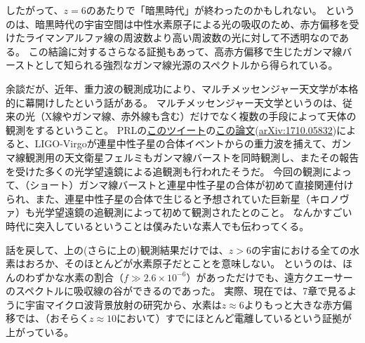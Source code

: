 \documentclass[11pt]{ltjsarticle}
\theoremstyle{plain}
\theoremstyle{break}
\begin{document}
\newpage
したがって、$z=6$のあたりで「暗黒時代」が終わったのかもしれない。
というのは、暗黒時代の宇宙空間は中性水素原子による光の吸収のため、赤方偏移を受けたライマンアルファ線の周波数より高い周波数の光に対して不透明なのである。
この結論に対するさらなる証拠もあって、高赤方偏移で生じたガンマ線バーストとして知られる強烈なガンマ線光源のスペクトルから得られている。

余談だが、近年、重力波の観測成功により、マルチメッセンジャー天文学が本格的に幕開けしたという話がある。
マルチメッセンジャー天文学というのは、従来の光（X線やガンマ線、赤外線も含む）だけでなく複数の手段によって天体の観測をするということ。
PRLの\href{https://twitter.com/PhysRevLett/status/919925957573582848}{このツイート}の\href{https://journals.aps.org/prl/abstract/10.1103/PhysRevLett.119.161101}{この論文}(\href{https://arxiv.org/abs/1710.05832}{arXiv:1710.05832})によると、LIGO-Virgoが連星中性子星の合体イベントからの重力波を捕えて、ガンマ線観測用の天文衛星フェルミもガンマ線バーストを同時観測し、またその報告を受けた多くの光学望遠鏡による追観測も行われたそうだ。
今回の観測によって、（ショート）ガンマ線バーストと連星中性子星の合体が初めて直接関連付けられ、また、連星中性子星の合体で生じると予想されていた巨新星（キロノヴァ）も光学望遠鏡の追観測によって初めて観測されたとのこと。
なんかすごい時代に突入しているということは僕みたいな素人でも伝わってくる。

話を戻して、上の(さらに上の)観測結果だけでは、$z>6$の宇宙における全ての水素はおろか、そのほとんどが水素原子だとことを意味しない。
というのは、ほんのわずかな水素の割合（$f \gg 2.6 \times 10^{-6}$）があっただけでも、遠方クエーサーのスペクトルに吸収線の谷ができるのであった。
実際、現在では、7章で見るように宇宙マイクロ波背景放射の研究から、水素は$z\approx 6$よりもっと大きな赤方偏移では、（おそらく$z \approx 10$において）すでにほとんど電離しているという証拠が上がっている。
\end{document}
